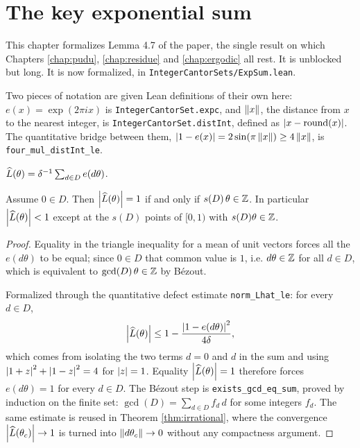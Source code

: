 \chapter{The key exponential sum}
\label{chap:expsum}

This chapter formalizes Lemma 4.7 of the paper, the single result on which
Chapters \ref{chap:pudu}, \ref{chap:residue} and \ref{chap:ergodic} all rest.
It is unblocked but long.  It is now formalized, in
\texttt{IntegerCantorSets/ExpSum.lean}.

Two pieces of notation are given Lean definitions of their own here:
$e(x) = \exp(2\pi i x)$ is \texttt{IntegerCantorSet.expc}, and
$\left\lVert x \right\rVert$, the distance from $x$ to the nearest integer, is
\texttt{IntegerCantorSet.distInt}, defined as $\left\lvert x - \mathrm{round}(x) \right\rvert$.
The quantitative bridge between them, $\left\lvert 1 - e(x) \right\rvert = 2\sin(\pi\left\lVert x \right\rVert)
\geq 4\left\lVert x \right\rVert$, is \texttt{four\_mul\_distInt\_le}.

\begin{definition}
  \label{def:Lhat}
  \leanok
  $\widehat{L}(\theta) = \delta^{-1} \sum_{d \in D} e(d\theta)$.
\end{definition}

\begin{lemma}
  \label{lem:Lhat-abs-one}
  \leanok
  Assume $0 \in D$. Then $\left\lvert \widehat{L}(\theta) \right\rvert = 1$ if and only if
  $s(D)\,\theta \in \mathbb{Z}$. In particular $\left\lvert \widehat{L}(\theta) \right\rvert < 1$ except at
  the $s(D)$ points of $[0,1)$ with $s(D)\theta \in \mathbb{Z}$.
\end{lemma}
\begin{proof}
  \leanok
  Equality in the triangle inequality for a mean of unit vectors forces all
  the $e(d\theta)$ to be equal; since $0 \in D$ that common value is $1$, i.e.
  $d\theta \in \mathbb{Z}$ for all $d \in D$, which is equivalent to
  $\gcd(D)\,\theta \in \mathbb{Z}$ by B\'ezout.

  Formalized through the quantitative defect estimate
  \texttt{norm\_Lhat\_le}: for every $d \in D$,
  \[
    \left\lvert \widehat{L}(\theta) \right\rvert \leq 1 - \frac{\left\lvert 1 - e(d\theta) \right\rvert^2}{4\delta},
  \]
  which comes from isolating the two terms $d = 0$ and $d$ in the sum and
  using $\left\lvert 1 + z \right\rvert^2 + \left\lvert 1 - z \right\rvert^2 = 4$ for $\left\lvert z \right\rvert = 1$.  Equality
  $\left\lvert \widehat{L}(\theta) \right\rvert = 1$ therefore forces $e(d\theta) = 1$ for every
  $d \in D$.  The B\'ezout step is \texttt{exists\_gcd\_eq\_sum}, proved by
  induction on the finite set: $\gcd(D) = \sum_{d \in D} f_d\, d$ for some
  integers $f_d$.  The same estimate is reused in
  Theorem \ref{thm:irrational}, where the convergence
  $\left\lvert \widehat{L}(\theta_c) \right\rvert \to 1$ is turned into $\left\lVert d\theta_c \right\rVert \to 0$
  without any compactness argument.
\end{proof}

